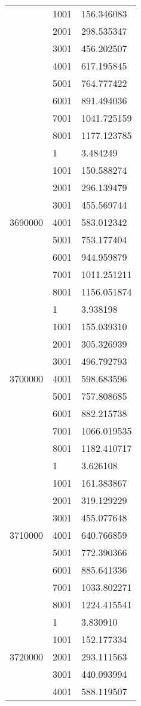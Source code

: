 \begin{table}[htb!]
\begin{tabular}{lll}
 & 1001 & 156.346083 \\
 & 2001 & 298.535347 \\
 & 3001 & 456.202507 \\
 & 4001 & 617.195845 \\
 & 5001 & 764.777422 \\
 & 6001 & 891.494036 \\
 & 7001 & 1041.725159 \\
 & 8001 & 1177.123785 \\
\multirow[c]{9}{*}{3690000} & 1 & 3.484249 \\
 & 1001 & 150.588274 \\
 & 2001 & 296.139479 \\
 & 3001 & 455.569744 \\
 & 4001 & 583.012342 \\
 & 5001 & 753.177404 \\
 & 6001 & 944.959879 \\
 & 7001 & 1011.251211 \\
 & 8001 & 1156.051874 \\
\multirow[c]{9}{*}{3700000} & 1 & 3.938198 \\
 & 1001 & 155.039310 \\
 & 2001 & 305.326939 \\
 & 3001 & 496.792793 \\
 & 4001 & 598.683596 \\
 & 5001 & 757.808685 \\
 & 6001 & 882.215738 \\
 & 7001 & 1066.019535 \\
 & 8001 & 1182.410717 \\
\multirow[c]{9}{*}{3710000} & 1 & 3.626108 \\
 & 1001 & 161.383867 \\
 & 2001 & 319.129229 \\
 & 3001 & 455.077648 \\
 & 4001 & 640.766859 \\
 & 5001 & 772.390366 \\
 & 6001 & 885.641336 \\
 & 7001 & 1033.802271 \\
 & 8001 & 1224.415541 \\
\multirow[c]{9}{*}{3720000} & 1 & 3.830910 \\
 & 1001 & 152.177334 \\
 & 2001 & 293.111563 \\
 & 3001 & 440.093994 \\
 & 4001 & 588.119507 \\

\end{tabular}
\end{table}
